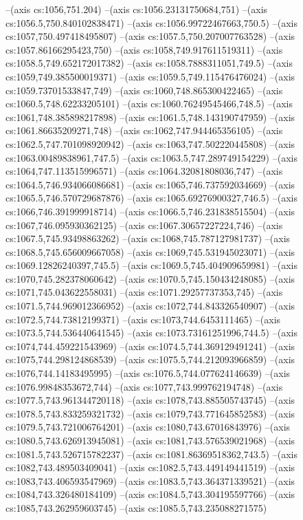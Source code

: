 --(axis cs:1056,751.204)
--(axis cs:1056.23131750684,751)
--(axis cs:1056.5,750.840102838471)
--(axis cs:1056.99722467663,750.5)
--(axis cs:1057,750.497418495807)
--(axis cs:1057.5,750.207007763528)
--(axis cs:1057.86166295423,750)
--(axis cs:1058,749.917611519311)
--(axis cs:1058.5,749.652172017382)
--(axis cs:1058.7888311051,749.5)
--(axis cs:1059,749.385500019371)
--(axis cs:1059.5,749.115476476024)
--(axis cs:1059.73701533847,749)
--(axis cs:1060,748.865300422465)
--(axis cs:1060.5,748.62233205101)
--(axis cs:1060.76249545466,748.5)
--(axis cs:1061,748.385898217898)
--(axis cs:1061.5,748.143190747959)
--(axis cs:1061.86635209271,748)
--(axis cs:1062,747.944465356105)
--(axis cs:1062.5,747.701098920942)
--(axis cs:1063,747.502220445808)
--(axis cs:1063.00489838961,747.5)
--(axis cs:1063.5,747.289749154229)
--(axis cs:1064,747.113515996571)
--(axis cs:1064.32081808036,747)
--(axis cs:1064.5,746.934066086681)
--(axis cs:1065,746.737592034669)
--(axis cs:1065.5,746.570729687876)
--(axis cs:1065.69276900327,746.5)
--(axis cs:1066,746.391999918714)
--(axis cs:1066.5,746.231838515504)
--(axis cs:1067,746.095930362125)
--(axis cs:1067.30657227224,746)
--(axis cs:1067.5,745.93498863262)
--(axis cs:1068,745.787127981737)
--(axis cs:1068.5,745.656009667058)
--(axis cs:1069,745.531945023071)
--(axis cs:1069.12826240397,745.5)
--(axis cs:1069.5,745.404909659981)
--(axis cs:1070,745.282378060642)
--(axis cs:1070.5,745.150434248085)
--(axis cs:1071,745.043622558031)
--(axis cs:1071.29257737353,745)
--(axis cs:1071.5,744.969012366952)
--(axis cs:1072,744.843326540907)
--(axis cs:1072.5,744.73812199371)
--(axis cs:1073,744.6453111465)
--(axis cs:1073.5,744.536440641545)
--(axis cs:1073.73161251996,744.5)
--(axis cs:1074,744.459221543969)
--(axis cs:1074.5,744.369129491241)
--(axis cs:1075,744.298124868539)
--(axis cs:1075.5,744.212093966859)
--(axis cs:1076,744.14183495995)
--(axis cs:1076.5,744.077624146639)
--(axis cs:1076.99848353672,744)
--(axis cs:1077,743.999762194748)
--(axis cs:1077.5,743.961344720118)
--(axis cs:1078,743.885505743745)
--(axis cs:1078.5,743.833259321732)
--(axis cs:1079,743.771645852583)
--(axis cs:1079.5,743.721006764201)
--(axis cs:1080,743.67016843976)
--(axis cs:1080.5,743.626913945081)
--(axis cs:1081,743.576539021968)
--(axis cs:1081.5,743.526715782237)
--(axis cs:1081.86369518362,743.5)
--(axis cs:1082,743.489503409041)
--(axis cs:1082.5,743.449149441519)
--(axis cs:1083,743.406593547969)
--(axis cs:1083.5,743.364371339521)
--(axis cs:1084,743.326480184109)
--(axis cs:1084.5,743.304195597766)
--(axis cs:1085,743.262959603745)
--(axis cs:1085.5,743.235088271575)
